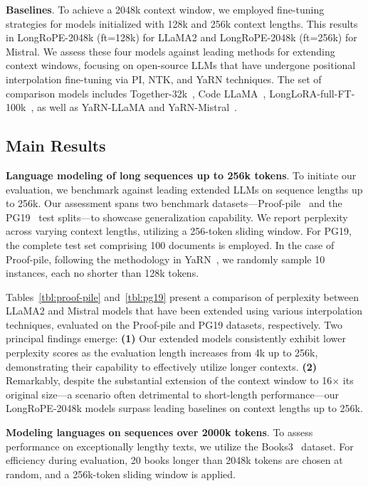 \textbf{Baselines}. To achieve a 2048k context window, we employed fine-tuning strategies for models initialized with 128k and 256k context lengths. This results in LongRoPE-2048k (ft=128k) for LLaMA2 and LongRoPE-2048k (ft=256k) for Mistral. We assess these four models against leading methods for extending context windows, focusing on open-source LLMs that have undergone positional interpolation fine-tuning via PI, NTK, and YaRN techniques. The set of comparison models includes Together-32k~\cite{together}, Code LLaMA~\cite{codellama}, LongLoRA-full-FT-100k~\cite{longlora}, as well as YaRN-LLaMA and YaRN-Mistral~\cite{yarn}.

\subsection{Main Results}

\label{sec:mainresult}
\textbf{Language modeling of long sequences up to 256k tokens}. To initiate our evaluation, we benchmark against leading extended LLMs on sequence lengths up to 256k. Our assessment spans two benchmark datasets—Proof-pile~\cite{pg19} and the PG19~\cite{pile} test splits—to showcase generalization capability. We report perplexity across varying context lengths, utilizing a 256-token sliding window. For PG19, the complete test set comprising 100 documents is employed. In the case of Proof-pile, following the methodology in YaRN~\cite{yarn}, we randomly sample 10 instances, each no shorter than 128k tokens.

Tables~\ref{tbl:proof-pile} and~\ref{tbl:pg19} present a comparison of perplexity between LLaMA2 and Mistral models that have been extended using various interpolation techniques, evaluated on the Proof-pile and PG19 datasets, respectively. Two principal findings emerge: \textbf{(1)} Our extended models consistently exhibit lower perplexity scores as the evaluation length increases from 4k up to 256k, demonstrating their capability to effectively utilize longer contexts. \textbf{(2)} Remarkably, despite the substantial extension of the context window to 16$\times$ its original size—a scenario often detrimental to short-length performance—our LongRoPE-2048k models surpass leading baselines on context lengths up to 256k.

\textbf{Modeling languages on sequences over 2000k tokens}. To assess performance on exceptionally lengthy texts, we utilize the Books3~\cite{pile} dataset. For efficiency during evaluation, 20 books longer than 2048k tokens are chosen at random, and a 256k-token sliding window is applied.

